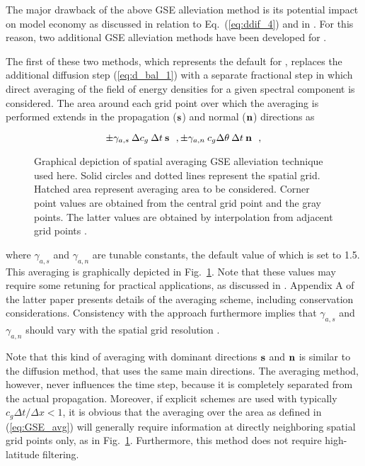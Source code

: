 \vspace{\baselineskip} \noindent 
The major drawback of the above GSE alleviation method is its potential impact
on model economy as discussed in relation to Eq.~(\ref{eq:ddif_4}) and in
\cite{tol:Waves01a,tol:OMOD02b}. For this reason, two additional GSE
alleviation methods have been developed for \ws.

The first of these two methods, which represents the default for \ws, replaces
the additional diffusion step (\ref{eq:d_bal_1}) with a separate fractional
step in which direct averaging of the field of energy densities for a given
spectral component is considered. The area around each grid point over which
the averaging is performed extends in the propagation ($\mbox{\bf s}$) and normal
($\mbox{\bf n}$) directions as

\begin{equation}
\pm \gamma_{a,s} \: \Delta c_g \: \Delta t \: \mbox{\bf s} \:\:\: ,
\pm \gamma_{a,n} \: c_g \Delta \theta \: \Delta t \: \mbox{\bf n} \:\:\: , \label{eq:GSE_avg}
\end{equation}

\begin{figure} \begin{center}
\caption{Graphical depiction of spatial averaging GSE alleviation technique
used here. Solid circles and dotted lines represent the spatial grid. Hatched
area represent averaging area to be considered. Corner point values are
obtained from the central grid point and the gray points. The latter values
are obtained by interpolation from adjacent grid points
\citep[from][]{tol:OMOD02b}.}
\label{fig:GSE_1} \botline
\end{center}
\end{figure}

\noindent
where $\gamma_{a,s}$ and $\gamma_{a,n}$ are tunable constants, the default
value of which is set to 1.5. This averaging is graphically depicted in
Fig.~\ref{fig:GSE_1}. Note that these values may require some retuning for
practical applications, as discussed in \cite{tol:OMOD02b}. Appendix A of the
latter paper presents details of the averaging scheme, including conservation
considerations. Consistency with the \cite{art:BH87} approach furthermore
implies that $\gamma_{a,s}$ and $\gamma_{a,n}$ should vary with the spatial
grid resolution \citep[see][Appendix]{tol:OMOD08a}.

Note that this kind of averaging with dominant directions $\mbox{\bf s}$ and $\mbox{\bf n}$ is
similar to the \cite{art:BH87} diffusion method, that uses the same main
directions. The averaging method, however, never influences the time step,
because it is completely separated from the actual propagation. Moreover, if
explicit schemes are used with typically $c_g \Delta t / \Delta x < 1$, it is
obvious that the averaging over the area as defined in (\ref{eq:GSE_avg}) will
generally require information at directly neighboring spatial grid points
only, as in Fig.~\ref{fig:GSE_1}. Furthermore, this method does not require
high-latitude filtering.

